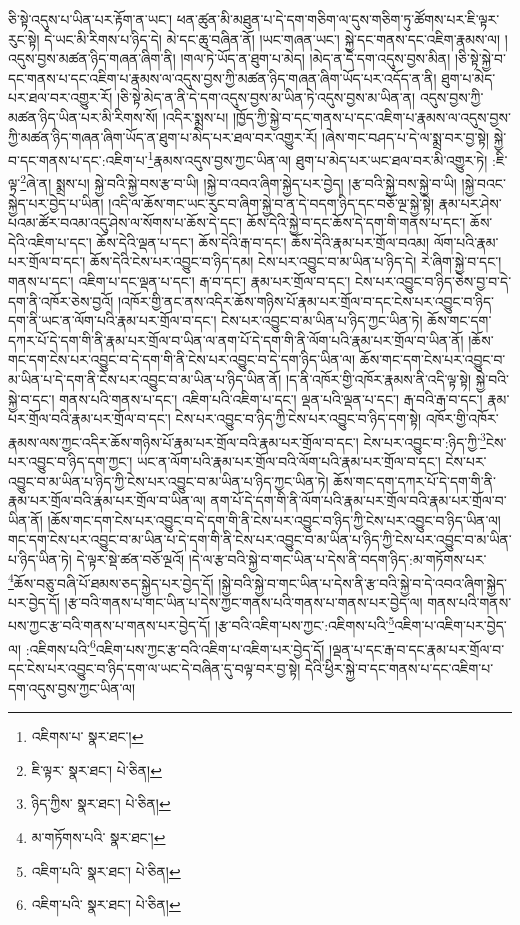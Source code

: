 ཅི་སྟེ་འདུས་པ་ཡིན་པར་རྟོག་ན་ཡང་། ཕན་ཚུན་མི་མཐུན་པ་དེ་དག་གཅིག་ལ་དུས་གཅིག་ཏུ་ཚོགས་པར་ཇི་ལྟར་རུང་སྟེ། དེ་ཡང་མི་རིགས་པ་ཉིད་དེ། མེ་དང་ཆུ་བཞིན་ནོ། །ཡང་གཞན་ཡང་། སྐྱེ་དང་གནས་དང་འཇིག་རྣམས་ལ། །འདུས་བྱས་མཚན་ཉིད་གཞན་ཞིག་ནི། །གལ་ཏེ་ཡོད་ན་ཐུག་པ་མེད། །མེད་ན་དེ་དག་འདུས་བྱས་མིན། །ཅི་སྟེ་སྐྱེ་བ་དང་གནས་པ་དང་འཇིག་པ་རྣམས་ལ་འདུས་བྱས་ཀྱི་མཚན་ཉིད་གཞན་ཞིག་ཡོད་པར་འདོད་ན་ནི། ཐུག་པ་མེད་པར་ཐལ་བར་འགྱུར་རོ། །ཅི་སྟེ་མེད་ན་ནི་དེ་དག་འདུས་བྱས་མ་ཡིན་ཏེ་འདུས་བྱས་མ་ཡིན་ན། འདུས་བྱས་ཀྱི་མཚན་ཉིད་ཡིན་པར་མི་རིགས་སོ། །འདིར་སྨྲས་པ། །ཁྱོད་ཀྱི་སྐྱེ་བ་དང་གནས་པ་དང་འཇིག་པ་རྣམས་ལ་འདུས་བྱས་ཀྱི་མཚན་ཉིད་གཞན་ཞིག་ཡོད་ན་ཐུག་པ་མེད་པར་ཐལ་བར་འགྱུར་རོ། །ཞེས་གང་བཤད་པ་དེ་ལ་སྨྲ་བར་བྱ་སྟེ། སྐྱེ་བ་དང་གནས་པ་དང་:འཇིག་པ་\footnote{འཇིགས་པ་  སྣར་ཐང་། }རྣམས་འདུས་བྱས་ཀྱང་ཡིན་ལ། ཐུག་པ་མེད་པར་ཡང་ཐལ་བར་མི་འགྱུར་ཏེ། :ཇི་ལྟ་\footnote{ཇི་ལྟར་  སྣར་ཐང་།  པེ་ཅིན། }ཞེ་ན། སྨྲས་པ། སྐྱེ་བའི་སྐྱེ་བས་རྩ་བ་ཡི། །སྐྱེ་བ་འབའ་ཞིག་སྐྱེད་པར་བྱེད། །རྩ་བའི་སྐྱེ་བས་སྐྱེ་བ་ཡི། །སྐྱེ་བའང་སྐྱེད་པར་བྱེད་པ་ཡིན། །འདི་ལ་ཆོས་གང་ཡང་རུང་བ་ཞིག་སྐྱེ་བ་ན་དེ་བདག་ཉིད་དང་བཅོ་ལྔ་སྐྱེ་སྟེ། རྣམ་པར་ཤེས་པའམ་ཚོར་བའམ་འདུ་ཤེས་ལ་སོགས་པ་ཆོས་དེ་དང་། ཆོས་དེའི་སྐྱེ་བ་དང་ཆོས་དེ་དག་གི་གནས་པ་དང་། ཆོས་དེའི་འཇིག་པ་དང་། ཆོས་དེའི་ལྡན་པ་དང་། ཆོས་དེའི་རྒ་བ་དང་། ཆོས་དེའི་རྣམ་པར་གྲོལ་བའམ། ལོག་པའི་རྣམ་པར་གྲོལ་བ་དང་། ཆོས་དེའི་ངེས་པར་འབྱུང་བ་ཉིད་དམ། ངེས་པར་འབྱུང་བ་མ་ཡིན་པ་ཉིད་དེ། རེ་ཞིག་སྐྱེ་བ་དང་། གནས་པ་དང་། འཇིག་པ་དང་ལྡན་པ་དང་། རྒ་བ་དང་། རྣམ་པར་གྲོལ་བ་དང་། ངེས་པར་འབྱུང་བ་ཉིད་ཅེས་བྱ་བ་དེ་དག་ནི་འཁོར་ཅེས་བྱའོ། །འཁོར་གྱི་ནང་ནས་འདིར་ཆོས་གཉིས་པོ་རྣམ་པར་གྲོལ་བ་དང་ངེས་པར་འབྱུང་བ་ཉིད་དག་ནི་ཡང་ན་ལོག་པའི་རྣམ་པར་གྲོལ་བ་དང་། ངེས་པར་འབྱུང་བ་མ་ཡིན་པ་ཉིད་ཀྱང་ཡིན་ཏེ། ཆོས་གང་དག་དཀར་པོ་དེ་དག་གི་ནི་རྣམ་པར་གྲོལ་བ་ཡིན་ལ་ནག་པོ་དེ་དག་གི་ནི་ལོག་པའི་རྣམ་པར་གྲོལ་བ་ཡིན་ནོ། །ཆོས་གང་དག་ངེས་པར་འབྱུང་བ་དེ་དག་གི་ནི་ངེས་པར་འབྱུང་བ་དེ་དག་ཉིད་ཡིན་ལ། ཆོས་གང་དག་ངེས་པར་འབྱུང་བ་མ་ཡིན་པ་དེ་དག་ནི་ངེས་པར་འབྱུང་བ་མ་ཡིན་པ་ཉིད་ཡིན་ནོ། །ད་ནི་འཁོར་གྱི་འཁོར་རྣམས་ནི་འདི་ལྟ་སྟེ། སྐྱེ་བའི་སྐྱེ་བ་དང་། གནས་པའི་གནས་པ་དང་། འཇིག་པའི་འཇིག་པ་དང་། ལྡན་པའི་ལྡན་པ་དང་། རྒ་བའི་རྒ་བ་དང་། རྣམ་པར་གྲོལ་བའི་རྣམ་པར་གྲོལ་བ་དང་། ངེས་པར་འབྱུང་བ་ཉིད་ཀྱི་ངེས་པར་འབྱུང་བ་ཉིད་དག་སྟེ། འཁོར་གྱི་འཁོར་རྣམས་ལས་ཀྱང་འདིར་ཆོས་གཉིས་པོ་རྣམ་པར་གྲོལ་བའི་རྣམ་པར་གྲོལ་བ་དང་། ངེས་པར་འབྱུང་བ་:ཉིད་ཀྱི་\footnote{ཉིད་ཀྱིས་  སྣར་ཐང་།  པེ་ཅིན། }ངེས་པར་འབྱུང་བ་ཉིད་དག་ཀྱང་། ཡང་ན་ལོག་པའི་རྣམ་པར་གྲོལ་བའི་ལོག་པའི་རྣམ་པར་གྲོལ་བ་དང་། ངེས་པར་འབྱུང་བ་མ་ཡིན་པ་ཉིད་ཀྱི་ངེས་པར་འབྱུང་བ་མ་ཡིན་པ་ཉིད་ཀྱང་ཡིན་ཏེ། ཆོས་གང་དག་དཀར་པོ་དེ་དག་གི་ནི་རྣམ་པར་གྲོལ་བའི་རྣམ་པར་གྲོལ་བ་ཡིན་ལ། ནག་པོ་དེ་དག་གི་ནི་ལོག་པའི་རྣམ་པར་གྲོལ་བའི་རྣམ་པར་གྲོལ་བ་ཡིན་ནོ། །ཆོས་གང་དག་ངེས་པར་འབྱུང་བ་དེ་དག་གི་ནི་ངེས་པར་འབྱུང་བ་ཉིད་ཀྱི་ངེས་པར་འབྱུང་བ་ཉིད་ཡིན་ལ། གང་དག་ངེས་པར་འབྱུང་བ་མ་ཡིན་པ་དེ་དག་གི་ནི་ངེས་པར་འབྱུང་བ་མ་ཡིན་པ་ཉིད་ཀྱི་ངེས་པར་འབྱུང་བ་མ་ཡིན་པ་ཉིད་ཡིན་ཏེ། དེ་ལྟར་སྡེ་ཚན་བཅོ་ལྔའོ། །དེ་ལ་རྩ་བའི་སྐྱེ་བ་གང་ཡིན་པ་དེས་ནི་བདག་ཉིད་:མ་གཏོགས་པར་\footnote{མ་གཏོགས་པའི་  སྣར་ཐང་། }ཆོས་བཅུ་བཞི་པོ་ཐམས་ཅད་སྐྱེད་པར་བྱེད་དོ། །སྐྱེ་བའི་སྐྱེ་བ་གང་ཡིན་པ་དེས་ནི་རྩ་བའི་སྐྱེ་བ་དེ་འབའ་ཞིག་སྐྱེད་པར་བྱེད་དོ། །རྩ་བའི་གནས་པ་གང་ཡིན་པ་དེས་ཀྱང་གནས་པའི་གནས་པ་གནས་པར་བྱེད་ལ། གནས་པའི་གནས་པས་ཀྱང་རྩ་བའི་གནས་པ་གནས་པར་བྱེད་དོ། །རྩ་བའི་འཇིག་པས་ཀྱང་:འཇིགས་པའི་\footnote{འཇིག་པའི་  སྣར་ཐང་།  པེ་ཅིན། }འཇིག་པ་འཇིག་པར་བྱེད་ལ། :འཇིགས་པའི་\footnote{འཇིག་པའི་  སྣར་ཐང་།  པེ་ཅིན། }འཇིག་པས་ཀྱང་རྩ་བའི་འཇིག་པ་འཇིག་པར་བྱེད་དོ། །ལྡན་པ་དང་རྒ་བ་དང་རྣམ་པར་གྲོལ་བ་དང་ངེས་པར་འབྱུང་བ་ཉིད་དག་ལ་ཡང་དེ་བཞིན་དུ་བལྟ་བར་བྱ་སྟེ། དེའི་ཕྱིར་སྐྱེ་བ་དང་གནས་པ་དང་འཇིག་པ་དག་འདུས་བྱས་ཀྱང་ཡིན་ལ། 